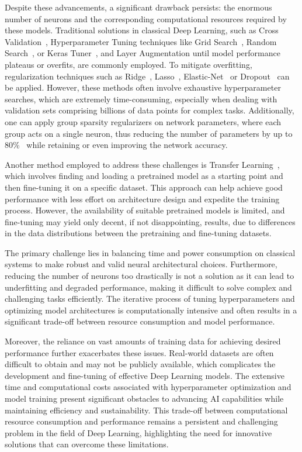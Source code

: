 \documentclass[12pt,a4paper]{report}
\begin{document}
Despite these advancements, a significant drawback persists: the enormous number of neurons and the corresponding computational resources required by these models. Traditional solutions in classical Deep Learning, such as Cross Validation~\cite{berrar2019cross}, Hyperparameter Tuning techniques like Grid Search~\cite{liashchynskyi2019grid}, Random Search~\cite{liashchynskyi2019grid}, or Keras Tuner~\cite{pon2021hyperparameter}, and Layer Augmentation until model performance plateaus or overfits, are commonly employed. To mitigate overfitting, regularization techniques such as Ridge~\cite{ogutu2012genomic}, Lasso~\cite{ogutu2012genomic}, Elastic-Net~\cite{ogutu2012genomic} or Dropout~\cite{srivastava2014dropout} can be applied. However, these methods often involve exhaustive hyperparameter searches, which are extremely time-consuming, especially when dealing with validation sets comprising billions of data points for complex tasks. Additionally, one can apply group sparsity regularizers on network parameters, where each group acts on a single neuron, thus reducing the number of parameters by up to 80\%~\cite{alvarez2018learning} while retaining or even improving the network accuracy.

Another method employed to address these challenges is Transfer Learning~\cite{weiss2016survey}, which involves finding and loading a pretrained model as a starting point and then fine-tuning it on a specific dataset. This approach can help achieve good performance with less effort on architecture design and expedite the training process. However, the availability of suitable pretrained models is limited, and fine-tuning may yield only decent, if not disappointing, results, due to differences in the data distributions between the pretraining and fine-tuning datasets.

The primary challenge lies in balancing time and power consumption on classical systems to make robust and valid neural architectural choices. Furthermore, reducing the number of neurons too drastically is not a solution as it can lead to underfitting and degraded performance, making it difficult to solve complex and challenging tasks efficiently. The iterative process of tuning hyperparameters and optimizing model architectures is computationally intensive and often results in a significant trade-off between resource consumption and model performance.

Moreover, the reliance on vast amounts of training data for achieving desired performance further exacerbates these issues. Real-world datasets are often difficult to obtain and may not be publicly available, which complicates the development and fine-tuning of effective Deep Learning models. The extensive time and computational costs associated with hyperparameter optimization and model training present significant obstacles to advancing AI capabilities while maintaining efficiency and sustainability. This trade-off between computational resource consumption and performance remains a persistent and challenging problem in the field of Deep Learning, highlighting the need for innovative solutions that can overcome these limitations.
\end{document}
